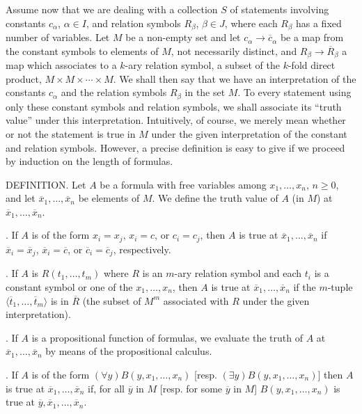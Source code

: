 \documentclass[12pt]{article}
\newcommand{\nn}{\noindent}
\begin{document}
Assume now that we are dealing with a collection $S$ of statements involving constants $c_\alpha$, $\alpha\in I$, and relation symbols $R_\beta$, $\beta\in J$, where each $R_\beta$ has a fixed number of variables. Let $M$ be a non-empty set and let $c_\alpha\to\overline{c}_\alpha$ be a map from the constant symbols to elements of $M$, not necessarily distinct, and $R_\beta\to\overline{R}_\beta$ a map which associates to a $k$-ary relation symbol, a subset of the $k$-fold direct product, $M\times M\times\cdots\times M$. We shall then say that we have an interpretation of the constants $c_\alpha$ and the relation symbols $R_\beta$ in the set $M$. To every statement using only these constant symbols and relation symbols, we shall associate its ``truth value'' under this interpretation. Intuitively, of course, we merely mean whether or not the statement is true in $M$ under the given interpretation of the constant and relation symbols. However, a precise definition is easy to give if we proceed by induction on the length of formulas. 

\nn DEFINITION. Let $A$ be a formula with free variables among $x_1,\dots,x_n$, $n \ge 0$, and let $\overline{x}_1, \dots, \overline{x}_n$ be elements of $M$. We define the truth value of $A$ (in $M$) at $\overline{x}_1,\dots,\overline{x}_n$.

\nn 1. If $A$ is of the form $x_i=x_j$, $x_i=c$, or $c_i=c_j$, then $A$ is true at $\overline{x}_1,\dots,\overline{x}_n$ if $\overline{x}_i=\overline{x}_j$, $\overline{x}_i=\overline{c}$, or $\overline{c}_i=\overline{c}_j$, respectively. 

\nn 2. If $A$ is $R(t_1,\dots,t_m)$ where $R$ is an $m$-ary relation symbol and each $t_i$ is a constant symbol or one of the $x_1,\dots,x_n$, then $A$ is true at $\overline{x}_1,\dots,\overline{x}_n$ if the $m$-tuple $\langle\overline{t}_1,\dots,\overline{t}_m\rangle$ is in $\overline{R}$ (the subset of $M^m$ associated with $R$ under the given interpretation).

\nn 3. If $A$ is a propositional function of formulas, we evaluate the truth of $A$ at $\overline{x}_1,\dots,\overline{x}_n$ by means of the propositional calculus. 

\nn 4. If $A$ is of the form $(\forall y)B(y,x_1,\dots,x_n)$ [resp. $(\exists y)B(y,x_1,\dots,x_n)$] then $A$ is true at $\overline{x}_1,\dots,\overline{x}_n$ if, for all $\overline{y}$ in $M$ [resp. for some $\overline{y}$ in $M$] $B(y,x_1,\dots,x_n)$ is true at $\overline{y},\overline{x}_1,\dots,\overline{x}_n$.\bigskip
\end{document}

